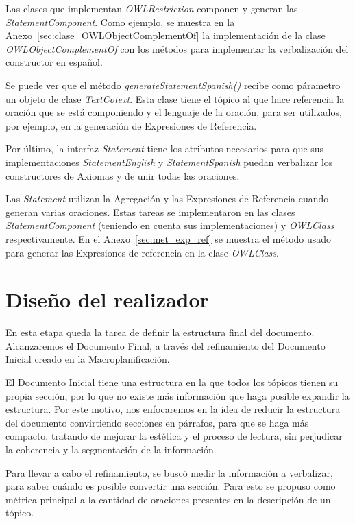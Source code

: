 Las clases que implementan \emph{OWLRestriction} componen y generan las \emph{StatementComponent}. Como ejemplo, se muestra en la Anexo~\ref{sec:clase_OWLObjectComplementOf} la implementación de la clase \emph{OWLObjectComplementOf} con los métodos para implementar la verbalización del constructor en español.

Se puede ver que el método \emph{generateStatementSpanish()} recibe como párametro un objeto de clase \emph{TextCotext}. Esta clase tiene el tópico al que hace referencia la oración que se está componiendo y el lenguaje de la oración, para ser utilizados, por ejemplo, en la generación de Expresiones de Referencia.

Por último, la interfaz \emph{Statement} tiene los atributos necesarios para que sus implementaciones \emph{StatementEnglish} y \emph{StatementSpanish} puedan verbalizar los constructores de Axiomas y de unir todas las oraciones. 

Las \emph{Statement} utilizan la Agregación y las Expresiones de Referencia cuando generan varias oraciones. Estas tareas se implementaron en las clases \emph{StatementComponent} (teniendo en cuenta sus implementaciones) y \emph{OWLClass} respectivamente. En el Anexo~\ref{sec:met_exp_ref} se muestra el método usado para generar las Expresiones de referencia en la clase \emph{OWLClass}.


\section{Diseño del realizador}
En esta etapa queda la tarea de definir la estructura final del documento. 
Alcanzaremos el Documento Final, a través del refinamiento del Documento Inicial creado en la Macroplanificación.

El Documento Inicial tiene una estructura en la que todos los tópicos tienen su propia sección, por lo que no existe más información que haga posible expandir la estructura. Por este motivo, nos enfocaremos en la idea de reducir la estructura del documento convirtiendo secciones en párrafos, para que se haga más compacto, tratando de mejorar la estética y el proceso de lectura, sin perjudicar la coherencia y la segmentación de la información.

Para llevar a cabo el refinamiento, se buscó medir la información a verbalizar, para saber cuándo es posible convertir una sección. Para esto se propuso como métrica principal a la cantidad de oraciones presentes en la descripción de un tópico.

